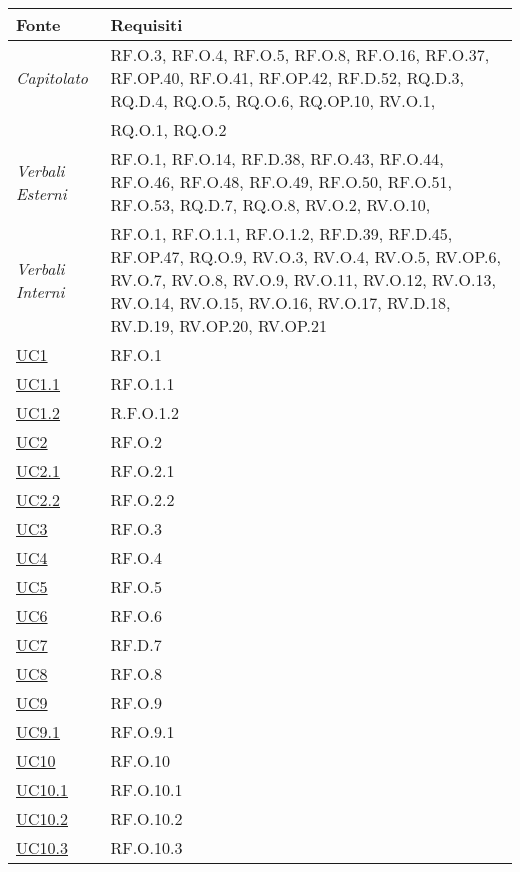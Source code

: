 \begin{longtable}{|P{4,5cm}|>{\arraybackslash}P{9cm}|}
  \hline
  \textbf{Fonte} & \textbf{Requisiti} \\
  \hline
  \emph{Capitolato} & RF.O.3, RF.O.4, RF.O.5, RF.O.8, RF.O.16, RF.O.37, RF.OP.40, RF.O.41, RF.OP.42, RF.D.52, RQ.D.3, RQ.D.4, RQ.O.5, RQ.O.6, RQ.OP.10, RV.O.1,  \\
  \hline
  \NdP{} & RQ.O.1, RQ.O.2 \\
  \hline
  \emph{Verbali Esterni} & RF.O.1, RF.O.14, RF.D.38, RF.O.43, RF.O.44, RF.O.46, RF.O.48, RF.O.49, RF.O.50, RF.O.51, RF.O.53, RQ.D.7, RQ.O.8, RV.O.2, RV.O.10, \\
  \hline
  \emph{Verbali Interni} & RF.O.1, RF.O.1.1, RF.O.1.2, RF.D.39, RF.D.45, RF.OP.47, RQ.O.9, RV.O.3, RV.O.4, RV.O.5, RV.OP.6, RV.O.7, RV.O.8, RV.O.9, RV.O.11, RV.O.12, RV.O.13, RV.O.14, RV.O.15, RV.O.16, RV.O.17, RV.D.18, RV.D.19, RV.OP.20, RV.OP.21 \\
  \hline
  \hyperref[UC1]{UC1} & RF.O.1 \\
  \hline
  \hyperref[UC1point1]{UC1.1} & RF.O.1.1 \\
  \hline
  \hyperref[UC1]{UC1.2} & R.F.O.1.2 \\
  \hline
  \hyperref[UC2]{UC2} & RF.O.2 \\
  \hline
  \hyperref[UC2point1]{UC2.1} & RF.O.2.1 \\
  \hline
  \hyperref[UC2point2]{UC2.2} & RF.O.2.2 \\
  \hline
  \hyperref[UC3]{UC3} & RF.O.3 \\
  \hline
  \hyperref[UC4]{UC4} & RF.O.4 \\
  \hline
  \hyperref[UC5]{UC5} & RF.O.5 \\
  \hline
  \hyperref[UC6]{UC6} & RF.O.6 \\
  \hline
  \hyperref[UC7]{UC7} & RF.D.7 \\
  \hline
  \hyperref[UC8]{UC8} & RF.O.8 \\
  \hline
  \hyperref[UC9]{UC9} & RF.O.9 \\
  \hline
  \hyperref[UC9point1]{UC9.1} & RF.O.9.1 \\
  \hline
  \hyperref[UC10]{UC10} & RF.O.10 \\
  \hline
  \hyperref[UC10point1]{UC10.1} & RF.O.10.1 \\ 
  \hline
  \hyperref[UC10point2]{UC10.2} & RF.O.10.2\\
  \hline
  \hyperref[UC10point3]{UC10.3} & RF.O.10.3\\

\end{longtable}
